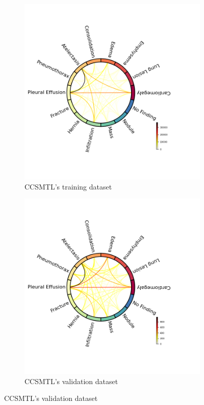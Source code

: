 \documentclass[11pt]{article}
\begin{document}
\begin{figure}[h!]
     \centering
     \begin{subfigure}[b]{0.45\linewidth}
         \centering
         \includegraphics[width=\linewidth]{plots/chords_ciusss_train}
         \caption{CCSMTL's training dataset}
         \vspace{4ex}
         \label{fig:chords_ciusss_train}
     \end{subfigure}
     \hfill
     \begin{subfigure}[b]{0.45\linewidth}
         \centering
         \includegraphics[width=\linewidth]{plots/chords_ciusss_valid}
         \caption{CCSMTL's validation dataset}
         \vspace{4ex}
         \label{fig:chords_ciusss_valid}
     \end{subfigure}



\end{figure}
\end{document}
